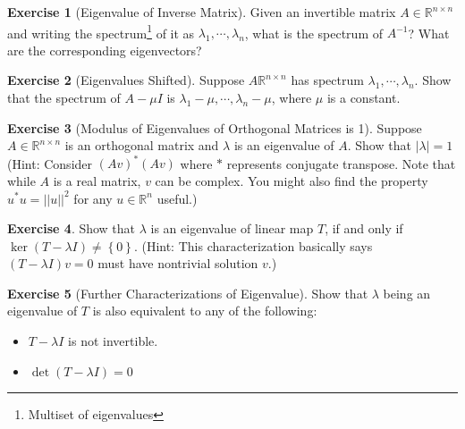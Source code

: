 \documentclass[12pt, a4paper]{article}
\newcommand{\R}{\mathbb{R}}
\newcommand{\norm}[1]{\lvert \lvert #1 \rvert \rvert}
\theoremstyle{remark}
\theoremstyle{definition}
\newtheorem{exercise}{Exercise}
\numberwithin{equation}{section}
\numberwithin{definition}{section}
\numberwithin{example}{section}
\numberwithin{exercise}{section}
\numberwithin{remark}{section}
\numberwithin{figure}{section}
\begin{document}
\begin{exercise}[Eigenvalue of Inverse Matrix]
    Given an invertible matrix $A \in \R^{n \times n}$ and writing the spectrum\footnote{Multiset of eigenvalues} of it as $\lambda_1, \cdots, \lambda_n$,
    what is the spectrum of $A^{-1}$? What are the corresponding eigenvectors?
\end{exercise}
\begin{exercise}[Eigenvalues Shifted]
    Suppose $A \R^{n \times n}$ has spectrum $\lambda_1, \cdots, \lambda_n$.
    Show that the spectrum of $A - \mu I$ is $\lambda_1 -\mu, \cdots, \lambda_n - \mu$, where $\mu$ is a constant.
\end{exercise}
\begin{exercise}[Modulus of Eigenvalues of Orthogonal Matrices is 1]
    Suppose $A \in \R^{n \times n}$ is an orthogonal matrix and $\lambda$ is an eigenvalue of $A$.
    Show that $|\lambda|=1$
    (Hint: Consider $\left( Av \right)^{*} \left( Av \right)$ where $*$ represents conjugate transpose. Note that while $A$ is a real matrix, $v$ can be complex. You might also find the property $u^* u = \norm{u}^2$ for any $u \in \R^n$ useful.)
\end{exercise}
\begin{exercise}
    Show that $\lambda$ is an eigenvalue of linear map $T$, if and only if $\ker {\left( T - \lambda I \right)} \neq \left\{ 0 \right\}$.
    (Hint: This characterization basically says $\left( T - \lambda I \right)v = 0$ must have nontrivial solution $v$.)
\end{exercise}
\begin{exercise}[Further Characterizations of Eigenvalue]
    Show that $\lambda$ being an eigenvalue of $T$ is also equivalent to any of the following:
    \begin{itemize}
        \item $T - \lambda I$ is not invertible.
        \item $\det \left( T - \lambda I \right) = 0$
    \end{itemize}
\end{exercise}
\end{document}
